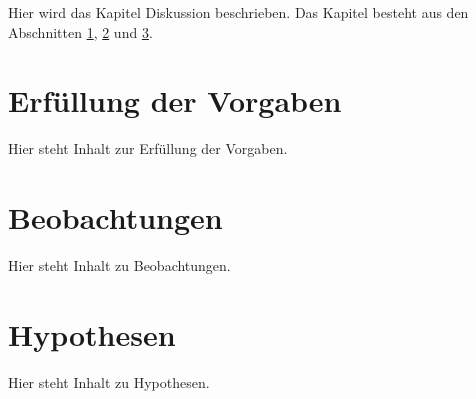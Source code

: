 Hier wird das Kapitel Diskussion beschrieben. Das Kapitel besteht aus den Abschnitten \ref{sec:erfuellung_der_vorgaben}, \ref{sec:beobachtungen} und \ref{sec:hypothesen}.


\section{Erfüllung der Vorgaben}
\label{sec:erfuellung_der_vorgaben}

Hier steht Inhalt zur Erfüllung der Vorgaben.


\section{Beobachtungen}
\label{sec:beobachtungen}

Hier steht Inhalt zu Beobachtungen.


\section{Hypothesen}
\label{sec:hypothesen}

Hier steht Inhalt zu Hypothesen.